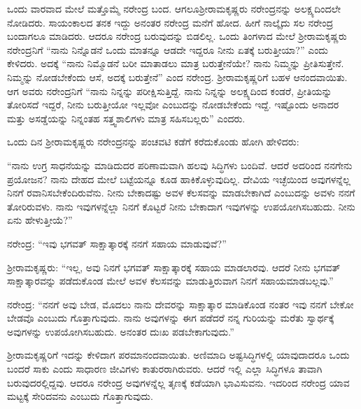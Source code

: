 ಒಂದು ವಾರವಾದ ಮೇಲೆ ಮತ್ತೊಮ್ಮೆ ನರೇಂದ್ರ ಬಂದ. ಆಗಲೂ\break ಶ‍್ರೀರಾಮಕೃಷ್ಣರು ನರೇಂದ್ರನನ್ನು ಅಲಕ್ಷ್ಯದಿಂದಲೇ ನೋಡಿದರು. ಸಾಯಂಕಾಲದ ತನಕ ಇದ್ದು ಅನಂತರ ನರೇಂದ್ರ ಮನೆಗೆ ಹೋದ. ಹೀಗೆ ನಾಲ್ಕೈದು ಸಲ ನರೇಂದ್ರ ಬಂದಾಗಲೂ ಮಾಡಿದರು. ಆದರೂ ನರೇಂದ್ರ ಬರುವುದನ್ನು ಬಿಡಲಿಲ್ಲ. ಒಂದು ತಿಂಗಳಾದ ಮೇಲೆ ಶ‍್ರೀರಾಮಕೃಷ್ಣರು ನರೇಂದ್ರನಿಗೆ “ನಾನು ನಿನ್ನೊಡನೆ ಒಂದು ಮಾತನ್ನೂ ಆಡದೇ ಇದ್ದರೂ ನೀನು ಏತಕ್ಕೆ ಬರುತ್ತೀಯಾ?” ಎಂದು ಕೇಳಿದರು. ಅದಕ್ಕೆ “ನಾನು ನಿಮ್ಮೊಡನೆ ಬರೀ ಮಾತಾಡಲು ಮಾತ್ರ ಬರುತ್ತೇನೆಯೇ? ನಾನು ನಿಮ್ಮನ್ನು ಪ್ರೀತಿಸುತ್ತೇನೆ. ನಿಮ್ಮನ್ನು ನೋಡಬೇಕೆಂದು ಆಸೆ, ಅದಕ್ಕೆ ಬರುತ್ತೇನೆ” ಎಂದ ನರೇಂದ್ರ. ಶ‍್ರೀರಾಮಕೃಷ್ಣರಿಗೆ ಬಹಳ ಆನಂದವಾಯಿತು. ಆಗ ಅವರು ನರೇಂದ್ರನಿಗೆ “ನಾನು ನಿನ್ನನ್ನು ಪರೀಕ್ಷಿಸುತ್ತಿದ್ದೆ. ನಾನು ನಿನ್ನನ್ನು ಅಲಕ್ಷ್ಯದಿಂದ ಕಂಡರೆ, ಪ್ರೀತಿಯನ್ನು ತೋರಿಸದೆ ಇದ್ದರೆ, ನೀನು ಬರುತ್ತೀಯೋ ಇಲ್ಲವೋ ಎಂಬುದನ್ನು ನೋಡಬೇಕೆಂದು ಇದ್ದೆ. ಇಷ್ಟೊಂದು ಅನಾದರ ಮತ್ತು ಅಸಡ್ಡೆಯನ್ನು ನಿನ್ನಂತಹ ಸತ್ತ್ವಶಾಲಿಗಳು ಮಾತ್ರ ಸಹಿಸಬಲ್ಲರು” ಎಂದರು.

ಒಂದು ದಿನ ಶ‍್ರೀರಾಮಕೃಷ್ಣರು ನರೇಂದ್ರನನ್ನು ಪಂಚವಟಿ ಕಡೆಗೆ ಕರೆದುಕೊಂಡು ಹೋಗಿ ಹೇಳಿದರು:

“ನಾನು ಉಗ್ರ ಸಾಧನೆಯನ್ನು ಮಾಡಿದುದರ ಪರಿಣಾಮವಾಗಿ ಹಲವು ಸಿದ್ಧಿಗಳು ಬಂದಿವೆ. ಆದರೆ ಅದರಿಂದ ನನಗೇನು ಪ್ರಯೋಜನ? ನಾನು ದೇಹದ ಮೇಲೆ ಬಟ್ಟೆಯನ್ನೂ ಕೂಡ ಹಾಕಿಕೊಳ್ಳುವುದಿಲ್ಲ. ದೇವಿಯ ಇಚ್ಛೆಯಿಂದ ಅವುಗಳನ್ನೆಲ್ಲ ನಿನಗೆ ರವಾನಿಸಬೇಕೆಂದಿರುವೆನು. ನೀನು ಬೇಕಾದಷ್ಟು ಅವಳ ಕೆಲಸವನ್ನು ಮಾಡಬೇಕಾಗಿದೆ ಎಂಬುದನ್ನು ಅವಳು ನನಗೆ ತೋರಿರುವಳು. ನಾನು ಇವುಗಳನ್ನೆಲ್ಲಾ ನಿನಗೆ ಕೊಟ್ಟರೆ ನೀನು ಬೇಕಾದಾಗ ಇವುಗಳನ್ನು ಉಪಯೋಗಿಸಬಹುದು. ನೀನು ಏನು ಹೇಳುತ್ತೀಯೆ?”

ನರೇಂದ್ರ: “ಇವು ಭಗವತ್ ಸಾಕ್ಷಾತ್ಕಾರಕ್ಕೆ ನನಗೆ ಸಹಾಯ ಮಾಡುವುವೆ?”

ಶ‍್ರೀರಾಮಕೃಷ್ಣರು: “ಇಲ್ಲ, ಅವು ನಿನಗೆ ಭಗವತ್ ಸಾಕ್ಷಾತ್ಕಾರಕ್ಕೆ ಸಹಾಯ ಮಾಡಲಾರವು. ಆದರೆ ನೀನು ಭಗವತ್ ಸಾಕ್ಷಾತ್ಕಾರವನ್ನು ಪಡೆದುಕೊಂಡ ಮೇಲೆ ಅವಳ ಕೆಲಸವನ್ನು ಮಾಡುತ್ತಿರುವಾಗ ನಿನಗೆ ಸಹಾಯಮಾಡಬಲ್ಲವು.”

ನರೇಂದ್ರ: “ನನಗೆ ಅವು ಬೇಡ, ಮೊದಲು ನಾನು ದೇವರನ್ನು ಸಾಕ್ಷಾತ್ಕಾರ ಮಾಡಿಕೊಂಡ ನಂತರ ಇವು ನನಗೆ ಬೇಕೋ ಬೇಡವೊ ಎಂಬುದು ಗೊತ್ತಾಗುವುದು. ನಾನು ಅವುಗಳನ್ನು ಈಗ ಪಡೆದರೆ ನನ್ನ ಗುರಿಯನ್ನು ಮರೆತು ಸ್ವಾರ್ಥಕ್ಕೆ ಅವುಗಳನ್ನು ಉಪಯೋಗಿಸಬಹುದು. ಅನಂತರ ದುಃಖ ಪಡಬೇಕಾಗುವುದು.”

\newpage

ಶ‍್ರೀರಾಮಕೃಷ್ಣರಿಗೆ ಇದನ್ನು ಕೇಳಿದಾಗ ಪರಮಾನಂದವಾಯಿತು. ಅಣಿಮಾದಿ ಅಷ್ಟಸಿದ್ಧಿಗಳಲ್ಲಿ ಯಾವುದಾದರೂ ಒಂದು ಬಂದರೆ ಸಾಕು ಎಂದು ಸಾಧಾರಣ ಜೀವಿಗಳು ಕಾತುರರಾಗಿರುವರು. ಆದರೆ ಇಲ್ಲಿ ಎಲ್ಲಾ ಸಿದ್ಧಿಗಳೂ ತಾವಾಗಿ ಬರುವುದರಲ್ಲಿದ್ದವು. ಆದರೂ ನರೇಂದ್ರ ಅವುಗಳನ್ನೆಲ್ಲ ತೃಣಕ್ಕೆ ಕಡೆಯಾಗಿ ಭಾವಿಸುವನು. ಇದರಿಂದ ನರೇಂದ್ರ ಯಾವ ಮಟ್ಟಕ್ಕೆ ಸೇರಿದವನು ಎಂಬುದು ಗೊತ್ತಾಗುವುದು.

